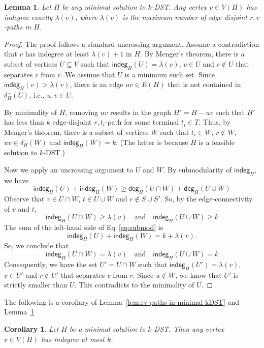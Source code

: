 \documentclass[11pt]{article}
\newtheorem{lemma}[theorem]{Lemma}
\newtheorem{corollary}[theorem]{Corollary}
\theoremstyle{definition}
\theoremstyle{remark}
\renewcommand{\deg}{\mathsf{deg}}
\newcommand{\indeg}{\mathsf{indeg}}
\renewcommand{\setminus}{-}
\begin{document}
\begin{lemma}
\label{lem:paths-eq-indeg}
Let $H$ be any minimal solution to $k$-DST.
Any vertex $v\in V(H)$ has indegree exactly $\lambda(v)$, 
where $\lambda(v)$ is the maximum number of 
edge-disjoint $r,v$-paths in $H$.
\end{lemma}

\begin{proof}
The proof follows a standard uncrossing argument.
Assume a contradiction that 
$v$ has indegree at least $\lambda(v)+1$ in $H$.
By Menger's theorem, there is a subset of 
vertices $U\subseteq V$ such that 
$\indeg_H(U) = \lambda(v)$, $v\in U$ and $r\not\in U$ 
that separates $v$ from $r$.
We assume that $U$ is a minimum such set. 
Since $\indeg_H(v) > \lambda(v)$, there is an edge
$uv\in E(H)$ that is not contained in $\delta^-_H(U)$,
i.e., $u,v\in U$. 

By minimality of $H$, removing $uv$ results in 
the graph $H'=H\setminus uv$ such that $H'$ has less than
$k$ edge-disjoint $r,t_i$-path for some terminal $t_i\in T$.
Thus, by Menger's theorem, 
there is a subset of vertices $W$
such that $t_i\in W$, $r\not\in W$, $uv\in\delta_H^-(W)$ 
and $\indeg_H(W)=k$.
(The latter is because $H$ is a feasible solution to $k$-DST.)

Now we apply an uncrossing argument to $U$ and $W$.
By submodularity of $\indeg_H$, we have
\[
\indeg_H(U) + \indeg_H(W) 
  \geq \deg_H(U\cap W) + \deg_H(U\cup W)
\]
Observe that $v\in U\cap W$, $t\in U\cup W$
and $r\not\in S\cup S'$. 
So, by the edge-connectivity of $v$ and $t$,  
\begin{equation}
\label{eq:submod}
\indeg_H(U\cap W) \geq \lambda(v) 
  \quad \mbox{and} \quad
\indeg_H(U\cup W) \geq k
\end{equation}
The sum of the left-hand side of Eq~\eqref{eq:submod} is 
\[
\indeg_H(U) + \indeg_H(W)  = k + \lambda(v).
\]
So, we conclude that 
\[
\indeg_H(U\cap W) = \lambda(v)
  \quad \mbox{and} \quad
\indeg_H(U\cup W) = k
\]
Consequently, we have the set $U' = U\cap W$ such that 
$\indeg_H(U')=\lambda(v)$, $v\in U'$ and $r\not\in U'$ that
separates $v$ from $r$.
Since $u\not\in W$, we know that $U'$ is strictly smaller than $U$.
This contradicts to the minimality of $U$.
\end{proof}

The following is a corollary of Lemma~\ref{lem:rv-paths-in-minimal-kDST}
and Lemma~\ref{lem:paths-eq-indeg}
\begin{corollary}
\label{cor:kdst-maxdeg-k}
Let $H$ be a minimal solution to $k$-DST.
Then any vertex $v\in V(H)$ has indegree at most $k$.
\end{corollary}
\end{document}
